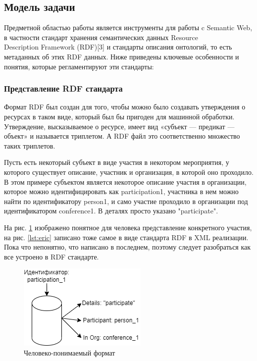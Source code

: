 \documentclass[12pt]{article}
\begin{document}
\subsection{Модель задачи}
Предметной областью работы является инструменты для работы c Semantic Web, в частности стандарт хранения семантических данных Resource \\ Description Framework (RDF)[3] и стандарты описания онтологий, то есть метаданных об этих RDF данных. Ниже приведены ключевые особенности и понятия, которые регламентируют эти стандарты:\par

\subsubsection{Представление RDF стандарта}

\qquad Формат RDF был создан для того, чтобы можно было создавать утверждения о ресурсах в таком виде, который был бы пригоден для машинной обработки. Утверждение, высказываемое о ресурсе, имеет вид «субъект — предикат — объект» и называется триплетом. А RDF файл это соответственно множество таких триплетов.\par

Пусть есть некоторый субъект в виде участия в некотором мероприятия, у которого существует описание, участник и организация, в которой оно проходило. В этом примере субъектом является некоторое описание участия в организации, которое можно идентифицировать как participation1, участника в нем можно найти по идентификатору person1, и само участие проходило в организации под идентификатором conference1. В деталях просто указано "participate".

На рис. \ref{fig:eric} изображено понятное для человека представление конкретного участия, на рис. \ref{lst:eric} записано тоже самое в виде стандарта RDF в XML реализации. Пока что непонятно, что написано в последнем, поэтому следует разобраться как все устроено в RDF стандарте.\par

\begin{figure}[!b]
    \centering
    \includegraphics{_images/eric.png}
    \caption{Человеко-понимаемый формат}
    \label{fig:eric}
\end{figure}
\end{document}
